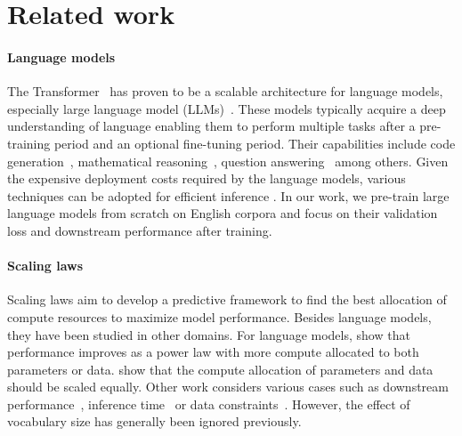 \section{Related work}
\label{sec:related}

\paragraph{Language models} The Transformer~\citep{vaswani2017attention} has proven to be a  scalable architecture for language models, especially large language model (LLMs)~\citep{brown2020language,chowdhery2023palm,rae2021scaling,achiam2023gpt,du2021glm,jiang2023mistral,ren2023pangu,touvron2023llama,wan2023efficient,metallama3blog,biderman2023pythia,almazrouei2023falcon,lozhkov2024starcoder,groeneveld2024olmo,soldaini2024dolma,team2024gemma,deepseekllm2024,luukkonen2023fingpt,li2024datacomplmsearchgenerationtraining,üstün2024ayamodelinstructionfinetuned}. These models typically acquire a deep understanding of language enabling them to perform multiple tasks  after a pre-training period and an optional fine-tuning period. Their capabilities include code generation~\citep{li2023starcoder,allal2023santacoder,muennighoff2023octopack,zhuo2024astraiosparameterefficientinstructiontuning,zhuo2024bigcodebenchbenchmarkingcodegeneration}, mathematical reasoning~\citep{wang2023dt,azerbayev2023llemma}, question answering~\citep{ouyang2022training,muennighoff2023crosslingualgeneralizationmultitaskfinetuning} among others. Given the expensive deployment costs required by the language models, various techniques can be adopted for efficient inference \citep{tao2023structured,tao2022compression,wu2024rethinking,wan2024d2o,lin2024duquant}.
In our work, we pre-train large language models from scratch on English corpora and focus on their validation loss and downstream performance after training.

\paragraph{Scaling laws} Scaling laws aim to develop a predictive framework to find the best allocation of compute resources to maximize model performance. Besides language models, they have been studied in other domains\cite{mei2024bigger,tian2024visual,cherti2023reproducible}. For language models, \citet{kaplan2020scaling} show that performance improves as a power law with more compute allocated to both parameters or data. \citet{hoffmann2022training} show that the compute allocation of parameters and data should be scaled equally. Other work considers various cases such as downstream performance~\citep{gadre2024language,isik2024scaling,ruan2024observational},  inference time~\citep{sardana2023beyond} or data constraints~\citep{muennighoff2024scaling,xue2024repeat}. However, the effect of vocabulary size has generally been ignored previously. 
